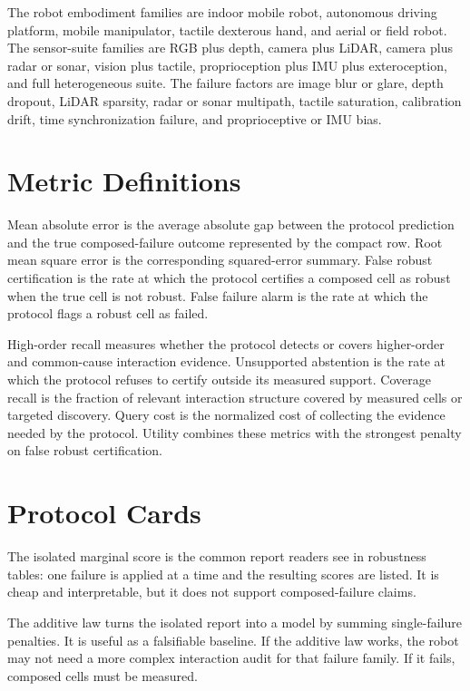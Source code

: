 \documentclass{article}
\begin{document}
The robot embodiment families are indoor mobile robot, autonomous driving platform, mobile manipulator, tactile dexterous hand, and aerial or field robot. The sensor-suite families are RGB plus depth, camera plus LiDAR, camera plus radar or sonar, vision plus tactile, proprioception plus IMU plus exteroception, and full heterogeneous suite. The failure factors are image blur or glare, depth dropout, LiDAR sparsity, radar or sonar multipath, tactile saturation, calibration drift, time synchronization failure, and proprioceptive or IMU bias.

\section{Metric Definitions}

Mean absolute error is the average absolute gap between the protocol prediction and the true composed-failure outcome represented by the compact row. Root mean square error is the corresponding squared-error summary. False robust certification is the rate at which the protocol certifies a composed cell as robust when the true cell is not robust. False failure alarm is the rate at which the protocol flags a robust cell as failed.

High-order recall measures whether the protocol detects or covers higher-order and common-cause interaction evidence. Unsupported abstention is the rate at which the protocol refuses to certify outside its measured support. Coverage recall is the fraction of relevant interaction structure covered by measured cells or targeted discovery. Query cost is the normalized cost of collecting the evidence needed by the protocol. Utility combines these metrics with the strongest penalty on false robust certification.

\section{Protocol Cards}

The isolated marginal score is the common report readers see in robustness tables: one failure is applied at a time and the resulting scores are listed. It is cheap and interpretable, but it does not support composed-failure claims.

The additive law turns the isolated report into a model by summing single-failure penalties. It is useful as a falsifiable baseline. If the additive law works, the robot may not need a more complex interaction audit for that failure family. If it fails, composed cells must be measured.
\end{document}
